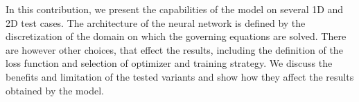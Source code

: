 In this contribution, we present the capabilities of the model on several 1D and 2D test cases. The architecture of the neural network is defined by the discretization of the domain on which the governing equations are solved. There are however other choices, that effect the results, including the definition of the loss function and selection of optimizer and training strategy. We discuss the benefits and limitation of the tested variants and show how they affect the results obtained by the model.